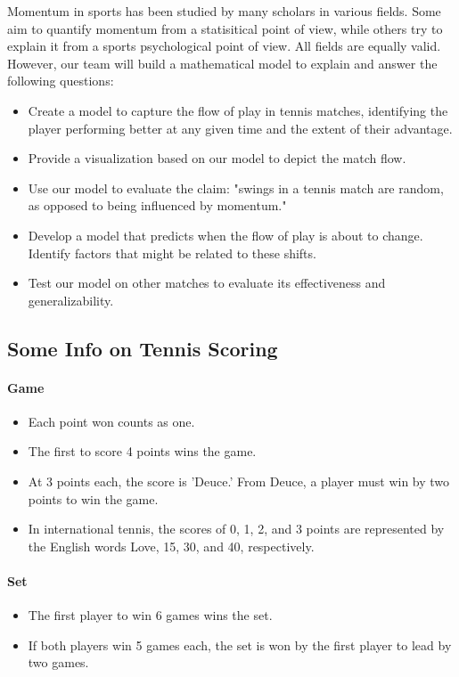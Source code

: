 \documentclass[UTF8]{mcmthesis}
\begin{document}
	Momentum in sports has been studied by many scholars in various fields. Some aim to quantify momentum from a statisitical point of view, while others try to explain it from a sports psychological point of view. All fields are equally valid. However, our team will build a mathematical model to explain and answer the following questions:
	
	\begin{itemize}
		\item Create a model to capture the flow of play in tennis matches, identifying the player performing better at any given time and the extent of their advantage.
		\item Provide a visualization based on our model to depict the match flow.
		\item Use our model to evaluate the claim: "swings in a tennis match are random, as opposed to being influenced by momentum."
		\item Develop a model that predicts when the flow of play is about to change. Identify factors that might be related to these shifts.
		\item Test our model on other matches to evaluate its effectiveness and generalizability.
	\end{itemize}

	\subsection{Some Info on Tennis Scoring}
	\paragraph{Game}
	\begin{itemize}
		\item Each point won counts as one. 
		\item The first to score 4 points wins the game.
		\item At 3 points each, the score is 'Deuce.' From Deuce, a player must win by two points to win the game. 
		\item In international tennis, the scores of 0, 1, 2, and 3 points are represented by the English words Love, 15, 30, and 40, respectively.
	\end{itemize}
		
	\paragraph{Set}
	\begin{itemize}
		\item The first player to win 6 games wins the set.
		\item If both players win 5 games each, the set is won by the first player to lead by two games.
	\end{itemize}
		
\end{document}
